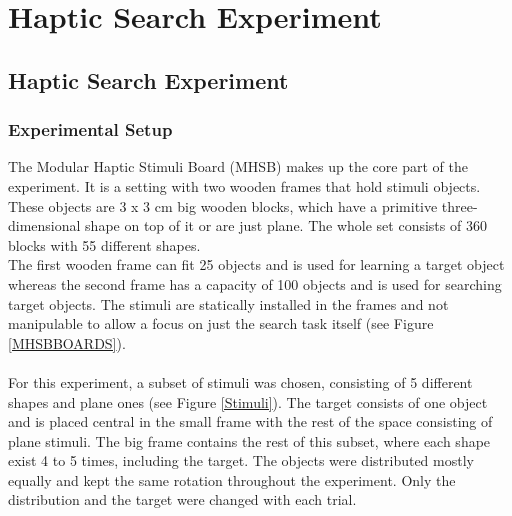 
\chapter{Haptic Search Experiment} %

\label{Haptic Search Experiment} %


\section{Haptic Search Experiment}
\subsection{Experimental Setup}
The Modular Haptic Stimuli Board (MHSB) makes up the core part of the experiment. It is a setting with two wooden frames that hold stimuli objects. These objects are 3 x 3 cm big wooden blocks, which have a primitive three-dimensional shape on top of it or are just plane. The whole set consists of 360 blocks with 55 different shapes.\\
The first wooden frame can fit 25 objects and is used for learning a target object whereas the second frame has a capacity of 100 objects and is used for searching target objects. The stimuli are statically installed in the frames and not manipulable to allow a focus on just the search task itself (see Figure \ref{MHSBBOARDS}).\\
\\
For this experiment, a subset of stimuli was chosen, consisting of 5 different shapes and plane ones (see Figure \ref{Stimuli}). The target consists of one object and is placed central in the small frame with the rest of the space consisting of plane stimuli. The big frame contains the rest of this subset, where each shape exist 4 to 5 times, including the target. The objects were distributed mostly equally and kept the same rotation throughout the experiment. Only the distribution and the target were changed with each trial.\\

